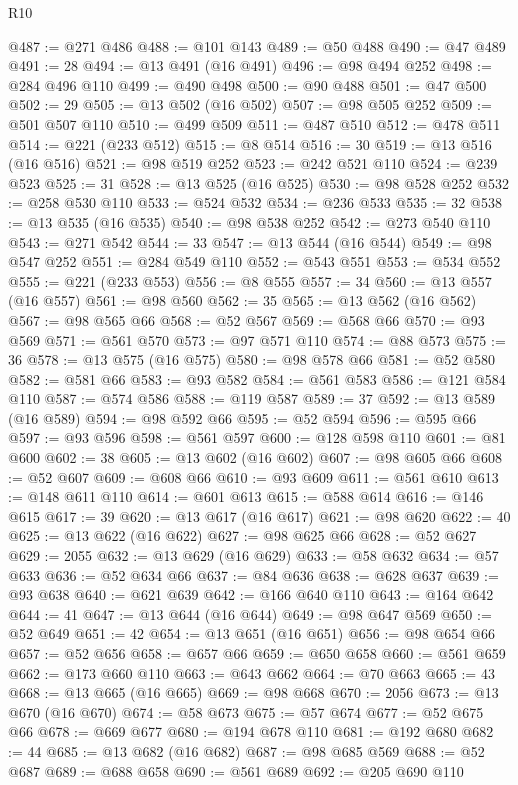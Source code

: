 \begin{lexlean}{R10}
\begin{coremodule}
@487 := @271 @486
@488 := @101 @143
@489 := @50 @488
@490 := @47 @489
@491 := 28
@494 := @13 @491 (@16 @491)
@496 := @98 @494 @252
@498 := @284 @496 @110
@499 := @490 @498
@500 := @90 @488
@501 := @47 @500
@502 := 29
@505 := @13 @502 (@16 @502)
@507 := @98 @505 @252
@509 := @501 @507 @110
@510 := @499 @509
@511 := @487 @510
@512 := @478 @511
@514 := @221 (@233 @512)
@515 := @8 @514
@516 := 30
@519 := @13 @516 (@16 @516)
@521 := @98 @519 @252
@523 := @242 @521 @110
@524 := @239 @523
@525 := 31
@528 := @13 @525 (@16 @525)
@530 := @98 @528 @252
@532 := @258 @530 @110
@533 := @524 @532
@534 := @236 @533
@535 := 32
@538 := @13 @535 (@16 @535)
@540 := @98 @538 @252
@542 := @273 @540 @110
@543 := @271 @542
@544 := 33
@547 := @13 @544 (@16 @544)
@549 := @98 @547 @252
@551 := @284 @549 @110
@552 := @543 @551
@553 := @534 @552
@555 := @221 (@233 @553)
@556 := @8 @555
@557 := 34
@560 := @13 @557 (@16 @557)
@561 := @98 @560
@562 := 35
@565 := @13 @562 (@16 @562)
@567 := @98 @565 @66
@568 := @52 @567
@569 := @568 @66
@570 := @93 @569
@571 := @561 @570
@573 := @97 @571 @110
@574 := @88 @573
@575 := 36
@578 := @13 @575 (@16 @575)
@580 := @98 @578 @66
@581 := @52 @580
@582 := @581 @66
@583 := @93 @582
@584 := @561 @583
@586 := @121 @584 @110
@587 := @574 @586
@588 := @119 @587
@589 := 37
@592 := @13 @589 (@16 @589)
@594 := @98 @592 @66
@595 := @52 @594
@596 := @595 @66
@597 := @93 @596
@598 := @561 @597
@600 := @128 @598 @110
@601 := @81 @600
@602 := 38
@605 := @13 @602 (@16 @602)
@607 := @98 @605 @66
@608 := @52 @607
@609 := @608 @66
@610 := @93 @609
@611 := @561 @610
@613 := @148 @611 @110
@614 := @601 @613
@615 := @588 @614
@616 := @146 @615
@617 := 39
@620 := @13 @617 (@16 @617)
@621 := @98 @620
@622 := 40
@625 := @13 @622 (@16 @622)
@627 := @98 @625 @66
@628 := @52 @627
@629 := 2055
@632 := @13 @629 (@16 @629)
@633 := @58 @632
@634 := @57 @633
@636 := @52 @634 @66
@637 := @84 @636
@638 := @628 @637
@639 := @93 @638
@640 := @621 @639
@642 := @166 @640 @110
@643 := @164 @642
@644 := 41
@647 := @13 @644 (@16 @644)
@649 := @98 @647 @569
@650 := @52 @649
@651 := 42
@654 := @13 @651 (@16 @651)
@656 := @98 @654 @66
@657 := @52 @656
@658 := @657 @66
@659 := @650 @658
@660 := @561 @659
@662 := @173 @660 @110
@663 := @643 @662
@664 := @70 @663
@665 := 43
@668 := @13 @665 (@16 @665)
@669 := @98 @668
@670 := 2056
@673 := @13 @670 (@16 @670)
@674 := @58 @673
@675 := @57 @674
@677 := @52 @675 @66
@678 := @669 @677
@680 := @194 @678 @110
@681 := @192 @680
@682 := 44
@685 := @13 @682 (@16 @682)
@687 := @98 @685 @569
@688 := @52 @687
@689 := @688 @658
@690 := @561 @689
@692 := @205 @690 @110

\end{coremodule}
\end{lexlean}
